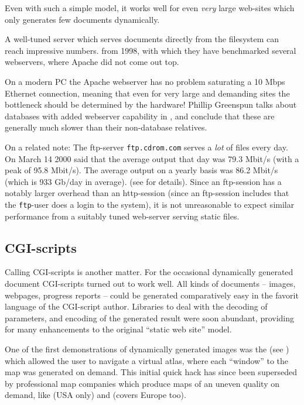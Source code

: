 Even with such a simple model, it works well for even \textit{very}
large web-sites which only generates few documents dynamically.

A well-tuned server which serves documents directly from the
filesystem can reach impressive numbers.
 from 1998, with which they have
benchmarked several webservers, where Apache did not come out top.


On a modern PC the Apache webserver has no problem saturating a 10
Mbps Ethernet connection, meaning that even for very large and
demanding sites the bottleneck should be determined by the hardware!
Phillip Greenspun talks about databases with added webserver
capability in \cite{phillipandalexsguidetowebpublishing}, and conclude
that these are generally much slower than their non-database
relatives.

On a related note: The ftp-server \texttt{ftp.cdrom.com} serves a
\textit{lot} of files every day.  On March 14 2000
 said that the average output that day was 79.3 Mbit/s
(with a peak of 95.8 Mbit/s).  The average output on a yearly basis
was 86.2 Mbit/s (which is 933 Gb/day in average).
(see  for details).
Since an ftp-session has a notably larger overhead than an
http-session (since an ftp-session includes that the \texttt{ftp}-user
does a login to the system), it is not unreasonable to expect similar
performance from a suitably tuned web-server serving static files.


\subsection{CGI-scripts}
\label{sec:cgi-scripts}



Calling CGI-scripts is another matter.  For the occasional dynamically
generated document CGI-scripts turned out to work well.  All kinds of
documents -- images, webpages, progress reports -- could be generated
comparatively easy in the favorit language of the CGI-script author.
Libraries to deal with the decoding of parameters, and encoding of the
generated result were soon abundant, providing for many enhancements
to the original ``static web site'' model.

\label{sec:map-generation-first-web-application} One of the first
demonstrations of dynamically generated images was the
 (see
) which allowed the user to navigate a
virtual atlas, where each ``window'' to the map was generated on
demand.  This initial quick hack has since been superseded by
professional map companies which produce maps of an uneven quality on
demand, like  (USA
only) and  (covers Europe
too).


